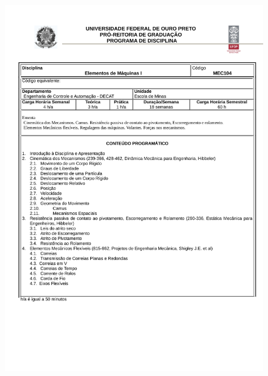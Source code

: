 \begin{figure}[p]
	\centering 
	\includegraphics[scale=0.7]{capitulos/anexo1-programas-disciplina/eg313.pdf}
\end{figure}

